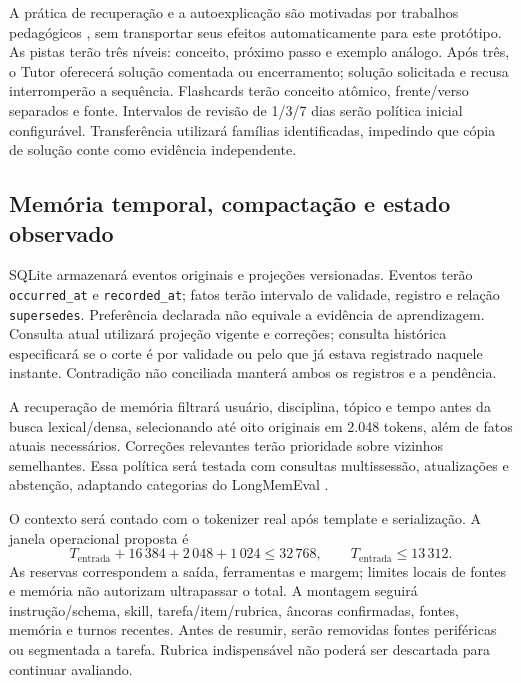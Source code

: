 \documentclass[12pt]{article}
\let\cite\citep
\newcommand{\code}[1]{\nolinkurl{#1}}
\begin{document}
A prática de recuperação e a autoexplicação são motivadas por trabalhos pedagógicos \cite{roediger2006testing,chi1994selfexplanation}, sem transportar seus efeitos automaticamente para este protótipo. As pistas terão três níveis: conceito, próximo passo e exemplo análogo. Após três, o Tutor oferecerá solução comentada ou encerramento; solução solicitada e recusa interromperão a sequência. Flashcards terão conceito atômico, frente/verso separados e fonte. Intervalos de revisão de 1/3/7 dias serão política inicial configurável. Transferência utilizará famílias identificadas, impedindo que cópia de solução conte como evidência independente.

\subsection{Memória temporal, compactação e estado observado}

SQLite armazenará eventos originais e projeções versionadas. Eventos terão \code{occurred_at} e \code{recorded_at}; fatos terão intervalo de validade, registro e relação \code{supersedes}. Preferência declarada não equivale a evidência de aprendizagem. Consulta atual utilizará projeção vigente e correções; consulta histórica especificará se o corte é por validade ou pelo que já estava registrado naquele instante. Contradição não conciliada manterá ambos os registros e a pendência.

A recuperação de memória filtrará usuário, disciplina, tópico e tempo antes da busca lexical/densa, selecionando até oito originais em 2.048 tokens, além de fatos atuais necessários. Correções relevantes terão prioridade sobre vizinhos semelhantes. Essa política será testada com consultas multissessão, atualizações e abstenção, adaptando categorias do LongMemEval \cite{wu2025longmemeval}.

O contexto será contado com o tokenizer real após template e serialização. A janela operacional proposta é
\begin{equation}
 T_{\mathrm{entrada}}+16\,384+2\,048+1\,024\leq32\,768,
 \qquad T_{\mathrm{entrada}}\leq13\,312.
\end{equation}
As reservas correspondem a saída, ferramentas e margem; limites locais de fontes e memória não autorizam ultrapassar o total. A montagem seguirá instrução/schema, skill, tarefa/item/rubrica, âncoras confirmadas, fontes, memória e turnos recentes. Antes de resumir, serão removidas fontes periféricas ou segmentada a tarefa. Rubrica indispensável não poderá ser descartada para continuar avaliando.
\end{document}

